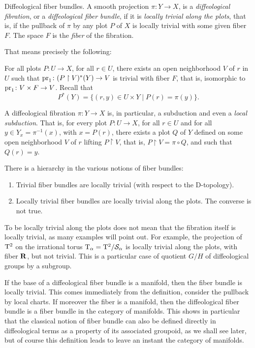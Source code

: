 \begin{Article}{Diffeological fiber bundles.}{}
  \label{Diffeological-Fiber-Bundles}
  A smooth projection $\pi \colon Y \to X$,
  is a \emph{diffeological fibration},
  or a \emph{diffeological fiber bundle},
  if it is {\em locally trivial along the plots},
  that is,
  if the pullback of $\pi$ by any plot $P$ of $X$ is locally trivial with some given fiber $F$.
  The space $F$ is the \emph{fiber} of the fibration.

  That means precisely the following:

  For all plots $P \colon U \to X$,
  for all $r \in U$,
  there exists an open neighborhood $V$ of $r$ in $U$ such that $\operatorname{pr}_1 \colon (P \restriction V)^*(Y) \to V$ is trivial with fiber $F$,
  that is,
  isomorphic to $\operatorname{pr}_1 \colon V \times F \to V$.
  Recall that
  $$%
    P^*(Y) = \{ (r,y) \in U \times Y \mid P(r) = \pi(y) \}.
  $$%

   A diffeological fibration $\pi \colon Y \to X$ is,
  in particular,
  a subduction and even a \emph{local subduction}.
  That is,
  for every plot $P \colon U \to X$,
  for all $r \in U$ and for all $y \in Y_x = \pi^{-1}(x)$,
  with $x = P(r)$,
  there exists a plot $Q$ of $Y$ defined on some open neighborhood $V$ of $r$ lifting $P \restriction V$,
  that is,
  $P \restriction V = \pi \circ Q$,
  and such that $Q(r) = y$.

    There is a hierarchy in the various notions of fiber bundles:

  \begin{enumerate}
    \item Trivial fiber bundles are locally trivial (with respect to the D-topology).
    \item Locally trivial fiber bundles are locally trivial along the plots.
    The converse is not true.
  \end{enumerate}

  To be locally trivial along the plots does not mean that the fibration
  itself is locally trivial,
  as many examples will point out.
  For example,
  the projection of $\mathrm{T}^2$ on the irrational torus $\mathrm{T}_\alpha = \mathrm{T}^2/\mathcal{S}_\alpha$ is locally trivial along the plots,
  with fiber $\mathbf{R}$,
  but not trivial.
  This is a particular case of quotient $G/H$ of diffeological groups by a subgroup.

   If the base of a diffeological fiber bundle is a manifold,
  then the fiber bundle is locally trivial.
  This comes immediately from the definition,
  consider the pullback by local charts.
  If moreover the fiber is a manifold,
  then the diffeological fiber bundle is a fiber bundle in the category of manifolds.
  This shows in particular that the classical notion of fiber bundle can also be defined directly in diffeological
  terms as a property of its associated groupoid, as we shall see later,
  but of course this definition leads to leave an instant the category of manifolds.
\end{Article}

